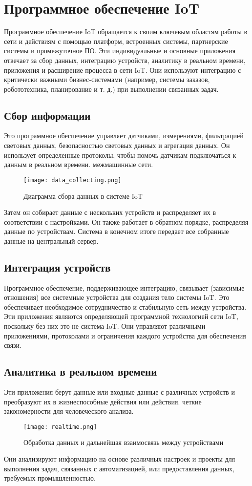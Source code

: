 \section{Программное обеспечение IoT}
Программное обеспечение IoT обращается к своим ключевым областям работы в сети и действиям с помощью платформ, встроенных
системы, партнерские системы и промежуточное ПО. Эти индивидуальные и основные приложения
отвечает за сбор данных, интеграцию устройств, аналитику в реальном времени, приложения и
расширение процесса в сети IoT. Они используют интеграцию с критически важными бизнес-системами
(например, системы заказов, робототехника, планирование и т. д.) при выполнении связанных задач.

\subsection{Сбор информации}
Это программное обеспечение управляет датчиками, измерениями, фильтрацией световых данных, безопасностью световых данных и
агрегация данных. Он использует определенные протоколы, чтобы помочь датчикам подключаться к данным в реальном времени.
межмашинные сети. 
\begin{figure}[h!]
    \centering
    \texttt{[image: data\_collecting.png]}
    \caption{Диаграмма сбора данных в системе IoT}
    \label{fig:task5:graph}
\end{figure}
Затем он собирает данные с нескольких устройств и распределяет их в
соответствии с настройками. Он также работает в обратном порядке, распределяя данные по устройствам. Система
в конечном итоге передает все собранные данные на центральный сервер.

\subsection{Интеграция устройств}
Программное обеспечение, поддерживающее интеграцию, связывает (зависимые отношения) все системные устройства для создания
тело системы IoT. Это обеспечивает необходимое сотрудничество и стабильную сеть между
устройства. Эти приложения являются определяющей программной технологией сети IoT, поскольку
без них это не система IoT. Они управляют различными приложениями, протоколами и
ограничения каждого устройства для обеспечения связи.\cite{IoTAzure}

\subsection{Аналитика в реальном времени}
Эти приложения берут данные или входные данные с различных устройств и преобразуют их в жизнеспособные действия или действия.
четкие закономерности для человеческого анализа. 
\begin{figure}[h!]
    \centering
    \texttt{[image: realtime.png]}
    \caption{Обработка данных и дальнейшая взаимосвязь между устройствами}
    \label{fig:task5:graph}
\end{figure}
Они анализируют информацию на основе различных настроек и
проекты для выполнения задач, связанных с автоматизацией, или предоставления данных, требуемых промышленностью.

